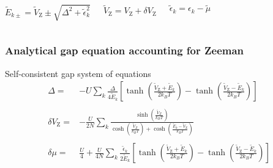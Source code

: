 \documentclass{beamer}
\begin{document}
\begin{frame}[noframenumbering]
\begin{columns}
\column{4.5cm}
\begin{alertblock}{}
\vspace*{-4.5mm}
\begin{equation*}
\tilde{E}_{k\pm}=\tilde{V}_{\text{Z}}\pm\sqrt{\Delta^{2}+\tilde{\epsilon}_{k}^{2}}
\end{equation*}
\end{alertblock}

\column{3.5cm}
\begin{alertblock}{}
\vspace*{-5.5mm}
\begin{equation*}
\tilde{V}_{\text{Z}}=V_{\text{Z}}+\delta V_{\text{Z}}
\end{equation*}
\end{alertblock}

\column{2.5cm}
\begin{alertblock}{}
\vspace*{-6mm}
\begin{equation*}
\tilde{\epsilon}_{k}=\epsilon_{k}-\tilde{\mu}
\end{equation*}
\end{alertblock}
\end{columns}

\end{frame}

\begin{frame}[noframenumbering]
\frametitle{Analytical gap equation accounting for Zeeman}

\begin{block}{Self-consistent gap system of equations}
\begin{align*}
\Delta=&-U\sum_{k}\frac{\Delta}{4\tilde{E}_{k}}\left[\tanh\left(\frac{\tilde{V}_{\text{Z}}+\tilde{E}_{k}}{2k_{B}T}\right)-\tanh\left(\frac{\tilde{V}_{\text{Z}}-\tilde{E}_{k}}{2k_{B}T}\right)\right]\\&\\\delta V_{\text{Z}}=&-\frac{U}{2N}\sum_{k}\frac{\sinh\left(\frac{\tilde{V}_{Z}}{k_{B}T}\right)}{\cosh\left(\frac{\tilde{V}_{Z}}{k_{B}T}\right)+\cosh\left(\frac{\tilde{E}_{k}-\tilde{V}_{\text{Z}}}{k_{B}T}\right)}\\&\\\delta\mu=&\frac{U}{4}+\frac{U}{4N}\sum_{k}\frac{\tilde{\epsilon}_{k}}{2\tilde{E}_{k}}\left[\tanh\left(\frac{\tilde{V}_{\text{Z}}+\tilde{E}_{k}}{2k_{B}T}\right)-\tanh\left(\frac{\tilde{V}_{\text{Z}}-\tilde{E}_{k}}{2k_{B}T}\right)\right]
\end{align*}
\end{block}

\end{frame}
\end{document}
